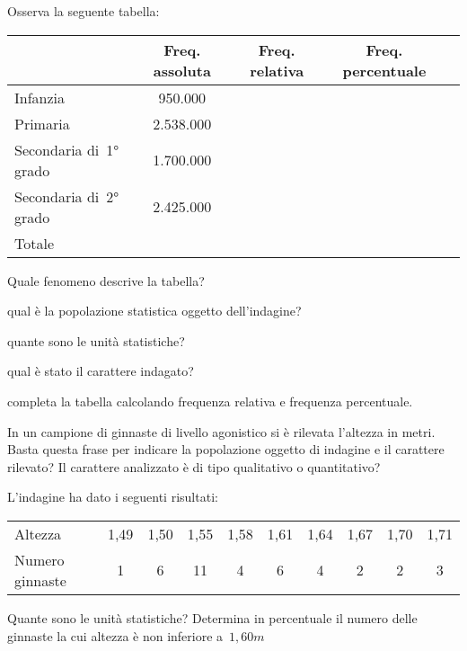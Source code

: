 \begin{esercizio}
\label{ese:A.7}
Osserva la seguente tabella:
 \begin{center}
 \begin{tabularx}{.92\textwidth}{Xcccc}
\toprule
 & Freq. assoluta & Freq. relativa & Freq. percentuale \\
\midrule
Infanzia & 950.000 & & \\
Primaria & 2.538.000 & & \\
Secondaria di~1° grado & 1.700.000 & & \\
Secondaria di~2° grado & 2.425.000 & & \\
Totale & & & \\
\bottomrule
\end{tabularx}
 \end{center}
\begin{itemize*}
\item Quale fenomeno descrive la tabella?
\item qual è la popolazione statistica oggetto dell'indagine?
\item quante sono le unità statistiche?
\item qual è stato il carattere indagato?
\item completa la tabella calcolando frequenza relativa e frequenza 
percentuale.
\end{itemize*}
\end{esercizio}

\begin{esercizio}
\label{ese:A.8}
In un campione di ginnaste di livello agonistico si è rilevata l'altezza in 
metri. Basta questa frase per indicare la popolazione oggetto
di indagine e il carattere rilevato? Il carattere analizzato è di tipo 
qualitativo o quantitativo?

L'indagine ha dato i seguenti risultati:
\begin{center}
 \begin{tabular}{lccccccccc}
\toprule
Altezza & 1,49 & 1,50 & 1,55 & 1,58 & 1,61 & 1,64 & 1,67 & 1,70 & 1,71 \\
Numero ginnaste & 1 & 6 & 11 & 4 & 6 & 4 & 2 & 2 & 3 \\
\bottomrule
\end{tabular}
\end{center}
Quante sono le unità statistiche? Determina in percentuale il numero delle 
ginnaste la cui altezza è non inferiore a~$1,60 \unit{m}$
\end{esercizio}


